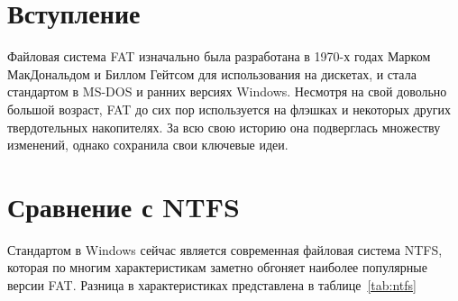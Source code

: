 \documentclass[a4paper,12pt]{article}
\begin{document}
    
    
    
    \tableofcontents
    
    \section{Вступление}

    Файловая система FAT изначально была разработана в 1970-х годах Марком МакДональдом и Биллом Гейтсом для использования на дискетах, и стала стандартом в MS-DOS и ранних версиях Windows. Несмотря на свой довольно большой возраст, FAT до сих пор используется на флэшках и некоторых других твердотельных накопителях. За всю свою историю она подверглась множеству изменений, однако сохранила свои ключевые идеи.

    \section{Сравнение с NTFS}

    Стандартом в Windows сейчас является современная файловая система NTFS, которая по многим характеристикам заметно обгоняет наиболее популярные версии FAT. Разница в характеристиках представлена в таблице~\ref{tab:ntfs}
    
\end{document}
